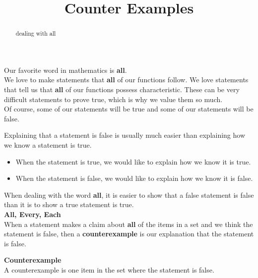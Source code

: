 \documentclass{ximera}
\title{Counter Examples}
\begin{document}
\begin{abstract}
dealing with all
\end{abstract}
\maketitle




Our favorite word in mathematics is \textbf{\textcolor{blue!55!black}{all}}. \\


We love to make statements that \textbf{all} of our functions follow. We love statements that tell us that \textbf{all} of our functions possess characteristic. These can be very difficult statements to prove true, which is why we value them so much. \\


Of course, some of our statements will be true and some of our statements will be false.

Explaining that a statement is false is usually much easier than explaining how we know a statement is true.

\begin{itemize}
\item When the statement is true, we would like to explain how we know it is true.
\item When the statement is false, we would like to explain how we know it is false.
\end{itemize}



When dealing with the word \textbf{all}, it is easier to show that a false statement is false than it is to show a true statement is true. \\


\textbf{\textcolor{blue!55!black}{All, Every, Each}} \\

When a statement makes a claim about \textbf{\textcolor{red!70!black}{all}} of the items in a set and we think the statement is false, then a \textbf{counterexample} is our explanation that the statement is false.



\begin{definition}  \textbf{\textcolor{green!50!black}{Counterexample}} \\


A counterexample is one item in the set where the statement is false.


\end{definition}
\end{document}
